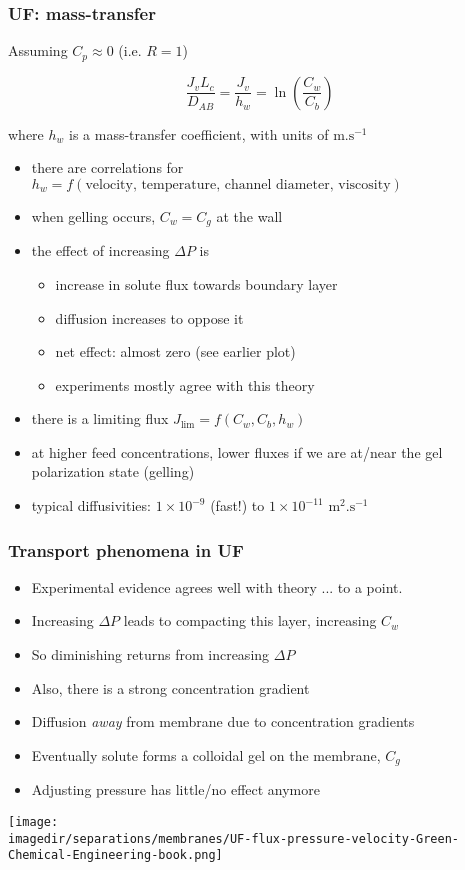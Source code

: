 \begin{frame}\frametitle{UF: mass-transfer {\color{myOrange}{key points}}}
	Assuming $C_p \approx 0$ (i.e. $R=1$)
	\begin{exampleblock}{}
		\[
			\dfrac{J_v L_c}{D_{AB}} =  \dfrac{J_v}{h_w} = \displaystyle \ln\left(\frac{C_w }{C_b }\right)
		\]
	\end{exampleblock}
	where $h_w$ is a  mass-transfer coefficient, with units of $\text{m.s}^{-1}$
	\begin{itemize}
		\item	there are correlations for $h_w= f(\text{velocity, temperature, channel diameter, viscosity})$
		\item	when gelling occurs, $C_w = C_g$ at the wall
		\item	the effect of increasing $\Delta P$ is
		\begin{itemize}
			\item	increase in solute flux towards boundary layer
			\item	diffusion increases to oppose it
			\item	net effect: almost zero (see earlier plot)
			\item	experiments mostly agree with this theory
		\end{itemize}
		\item	there is a limiting flux $J_\text{lim} = f(C_w, C_b, h_w)$
		\item	at higher feed concentrations, lower fluxes if we are at/near the gel polarization state (gelling)
		\item	typical diffusivities: $1 \times 10^{-9}$ (fast!) to $1 \times 10^{-11} \text{~m}^2\text{.s}^{-1}$
	\end{itemize}
\end{frame}

\begin{frame}\frametitle{Transport phenomena in UF}
	\begin{itemize}
		\item	Experimental evidence agrees well with theory ... to a point.
		\item	Increasing $\Delta P$ leads to compacting this layer, increasing $C_w$
		\item	So diminishing returns from increasing $\Delta P$
		\item	Also, there is a strong concentration gradient
		\item	Diffusion \emph{away} from membrane due to concentration gradients
		\item	Eventually solute forms a colloidal gel on the membrane, $C_g$
		\item	Adjusting pressure has little/no effect anymore
	\end{itemize}
	\begin{center}
		\texttt{[image: \\imagedir/separations/membranes/UF-flux-pressure-velocity-Green-Chemical-Engineering-book.png]}
	\end{center}
	\vspace{-12pt}
\end{frame}

